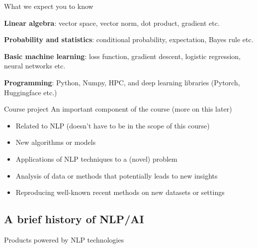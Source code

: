 \documentclass[usenames,dvipsnames,notes,11pt,aspectratio=169]{beamer}
\begin{document}
\begin{frame}
    {What we expect you to know}
    \begin{wideitemize}
        \item \textbf{Linear algebra}: vector space, vector norm, dot product, gradient etc.
        \item \textbf{Probability and statistics}: conditional probability, expectation, Bayes rule etc.
        \item \textbf{Basic machine learning}: loss function, gradient descent, logistic regression, neural networks etc.
        \item \textbf{Programming}: Python, Numpy, HPC, and deep learning libraries (Pytorch, Huggingface etc.)
    \end{wideitemize}
\end{frame}

\begin{frame}
    {Course project}
    An important component of the course (more on this later)
    \begin{itemize}
        \itemsep1em
        \item Related to NLP (doesn't have to be in the scope of this course)
        \item New algorithms or models
        \item Applications of NLP techniques to a (novel) problem
        \item Analysis of data or methods that potentially leads to new insights
        \item Reproducing well-known recent methods on new datasets or settings 
    \end{itemize}
\end{frame}

\subsection{A brief history of NLP/AI}
\begin{frame}
    {Products powered by NLP technologies}
\end{frame}
\end{document}
